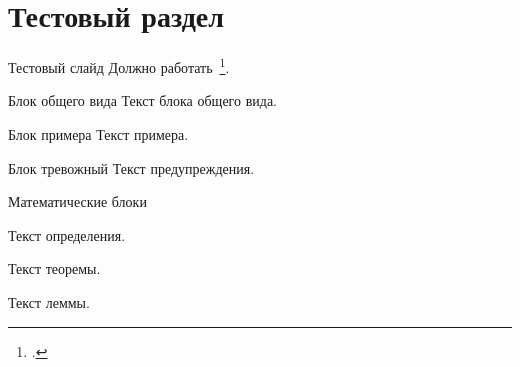 
\section{Тестовый раздел}

\begin{frame}{Тестовый слайд}
    Должно работать~\footcite{pqcrypto}.
    
    \begin{block}{Блок общего вида}
        Текст блока общего вида.
    \end{block}

    \begin{exampleblock}{Блок примера}
        Текст примера.
    \end{exampleblock}
    
    \begin{alertblock}{Блок тревожный}
        Текст предупреждения.
    \end{alertblock}

\end{frame}


\begin{frame}{Математические блоки}
    \begin{Def} 
        Текст определения.
    \end{Def}
    
    \begin{Thm} 
        Текст теоремы. 
    \end{Thm}
    
    \begin{Lem} 
        Текст леммы.
    \end{Lem}
\end{frame}

